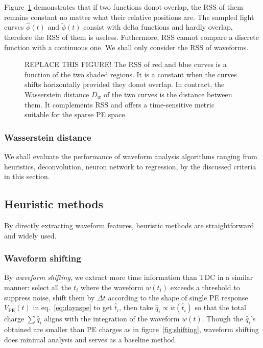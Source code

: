 Figure~\ref{fig:l2} demonstrates that if two functions donot overlap, the RSS of them remains constant no matter what their relative positions are.  The sampled light curves $\hat{\phi}(t)$ and $\tilde{\phi}(t)$ consist with delta functions and hardly overlap, therefore the RSS of them is useless.  Futhermore, RSS cannot compare a discrete function with a continuous one.  We shall only consider the RSS of waveforms.

\begin{figure}[H]
  \centering
  \resizebox{\textwidth}{!}{}
  \caption{\label{fig:l2} REPLACE THIS FIGURE!  The RSS of red and blue curves is a function of the two shaded regions. It is a constant when the curves shifts horizontally provided they donot overlap.  In contract, the Wasserstein distance $D_w$ of the two curves is the distance between them.  It complements RSS and offers a time-sensitive metric suitable for the sparse PE space.}
\end{figure}

\subsubsection{Wasserstein distance}
\label{sec:W-dist}



We shall evaluate the performance of waveform analysis algorithms ranging from heuristics, deconvolution, neuron network to regression, by the discussed criteria in this section.

\subsection{Heuristic methods}
By directly extracting waveform features, heuristic methods are straightforward and widely used. 

\subsubsection{Waveform shifting}
\label{sec:shifting}
By \textit{waveform shifting}, we extract more time information than TDC in a similar manner: select all the $t_i$ where the waveform $w(t_i)$ exceeds a threshold to suppress noise, shift them by $\Delta t$ according to the shape of single PE response $V_\mathrm{PE}(t)$ in eq.~\eqref{eq:dayaspe} to get $\hat{t}_i$, then take $\hat{q}_i \propto w(\hat{t}_i)$ so that the total charge $\sum \hat{q}_i$ aligns with the integration of the waveform $w(t)$.  Though the $\hat{q}_i$'s obtained are smaller than PE charges as in figure~\ref{fig:shifting}, waveform shifting does minimal analysis and serves as a baseline method.

